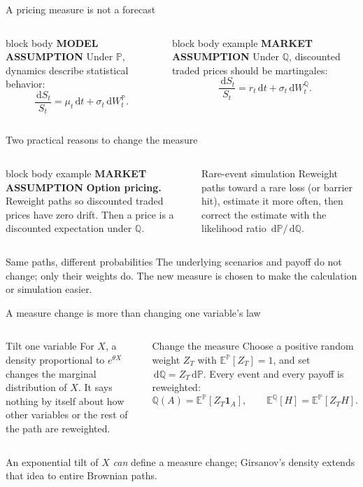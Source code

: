 \documentclass[handout,10pt,aspectratio=169]{beamer}
\newenvironment{modelbox}{\begin{beamercolorbox}[rounded=true,sep=0.7em,wd=\textwidth]{block body}
  \textbf{\color{CourseBlue}MODEL ASSUMPTION}\quad}{\end{beamercolorbox}}
\newenvironment{marketbox}{\begin{beamercolorbox}[rounded=true,sep=0.7em,wd=\textwidth]{block body example}
  \textbf{\color{CourseGreen}MARKET ASSUMPTION}\quad}{\end{beamercolorbox}}
\newcommand{\dd}{\,\mathrm d}
\newcommand{\E}{\mathbb E}
\newcommand{\Pp}{\mathbb P}
\newcommand{\Q}{\mathbb Q}
\newcommand{\1}{\mathbf 1}
\begin{document}
\begin{frame}{A pricing measure is not a forecast}
\begin{columns}[T,onlytextwidth]
\begin{modelbox}
Under \(\Pp\), dynamics describe statistical behavior:
\[
\frac{\dd S_t}{S_t}=\mu_t\dd t+\sigma_t\dd W_t^\Pp.
\]
\end{modelbox}
\begin{marketbox}
Under \(\Q\), discounted traded prices should be martingales:
\[
\frac{\dd S_t}{S_t}=r_t\dd t+\sigma_t\dd W_t^\Q.
\]
\end{marketbox}
\end{columns}
\end{frame}

\begin{frame}{Two practical reasons to change the measure}
\begin{columns}[T,onlytextwidth]
\begin{marketbox}
\textbf{Option pricing.} Reweight paths so discounted traded prices have
zero drift. Then a price is a discounted expectation under \(\Q\).
\end{marketbox}
\begin{exampleblock}{Rare-event simulation}
Reweight paths toward a rare loss (or barrier hit), estimate it more often,
then correct the estimate with the likelihood ratio \(\dd\Pp/\dd\Q\).
\end{exampleblock}
\end{columns}
\medskip
\begin{block}{Same paths, different probabilities}
The underlying scenarios and payoff do not change; only their weights do.
The new measure is chosen to make the calculation or simulation easier.
\end{block}
\end{frame}

\begin{frame}{A measure change is more than changing one variable's law}
\begin{columns}[T,onlytextwidth]
\begin{exampleblock}{Tilt one variable}
For \(X\), a density proportional to \(e^{\theta X}\) changes the
marginal distribution of \(X\). It says nothing by itself about how other
variables or the rest of the path are reweighted.
\end{exampleblock}
\begin{block}{Change the measure}
Choose a positive random weight \(Z_T\) with \(\E^\Pp[Z_T]=1\), and set
\(\dd\Q=Z_T\dd\Pp\). Every event and every payoff is reweighted:
\[
\Q(A)=\E^\Pp[Z_T\1_A],\qquad
\E^\Q[H]=\E^\Pp[Z_TH].
\]
\end{block}
\end{columns}
\medskip
An exponential tilt of \(X\) \emph{can} define a measure change; Girsanov's
density extends that idea to entire Brownian paths.
\end{frame}
\end{document}
